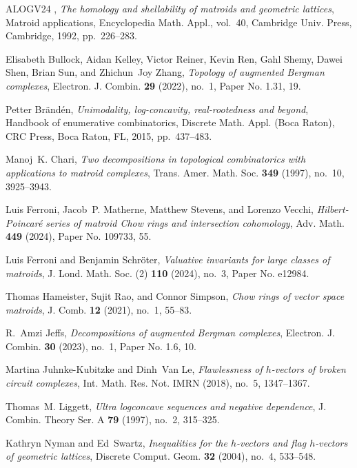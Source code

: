 \begin{thebibliography}{ALOGV24}
\bysame, \emph{The homology and shellability of matroids and geometric lattices}, Matroid applications, Encyclopedia Math. Appl., vol.~40, Cambridge Univ. Press, Cambridge, 1992, pp.~226--283. 

Elisabeth Bullock, Aidan Kelley, Victor Reiner, Kevin Ren, Gahl Shemy, Dawei Shen, Brian Sun, and Zhichun~Joy Zhang, \emph{Topology of augmented {B}ergman complexes}, Electron. J. Combin. \textbf{29} (2022), no.~1, Paper No. 1.31, 19. 

Petter Br{\"a}nd{\'e}n, \emph{Unimodality, log-concavity, real-rootedness and beyond}, Handbook of enumerative combinatorics, Discrete Math. Appl. (Boca Raton), CRC Press, Boca Raton, FL, 2015, pp.~437--483. 

Manoj~K. Chari, \emph{Two decompositions in topological combinatorics with applications to matroid complexes}, Trans. Amer. Math. Soc. \textbf{349} (1997), no.~10, 3925--3943. 

Luis Ferroni, Jacob~P. Matherne, Matthew Stevens, and Lorenzo Vecchi, \emph{Hilbert-{P}oincar\'e{} series of matroid {C}how rings and intersection cohomology}, Adv. Math. \textbf{449} (2024), Paper No. 109733, 55. 

Luis Ferroni and Benjamin Schr\"oter, \emph{Valuative invariants for large classes of matroids}, J. Lond. Math. Soc. (2) \textbf{110} (2024), no.~3, Paper No. e12984. 

Thomas Hameister, Sujit Rao, and Connor Simpson, \emph{Chow rings of vector space matroids}, J. Comb. \textbf{12} (2021), no.~1, 55--83. 

R.~Amzi Jeffs, \emph{Decompositions of augmented {B}ergman complexes}, Electron. J. Combin. \textbf{30} (2023), no.~1, Paper No. 1.6, 10. 

Martina Juhnke-Kubitzke and Dinh~Van Le, \emph{Flawlessness of {$h$}-vectors of broken circuit complexes}, Int. Math. Res. Not. IMRN (2018), no.~5, 1347--1367. 

Thomas~M. Liggett, \emph{Ultra logconcave sequences and negative dependence}, J. Combin. Theory Ser. A \textbf{79} (1997), no.~2, 315--325. 

Kathryn Nyman and Ed~Swartz, \emph{Inequalities for the {$h$}-vectors and flag {$h$}-vectors of geometric lattices}, Discrete Comput. Geom. \textbf{32} (2004), no.~4, 533--548. 


\end{thebibliography}
